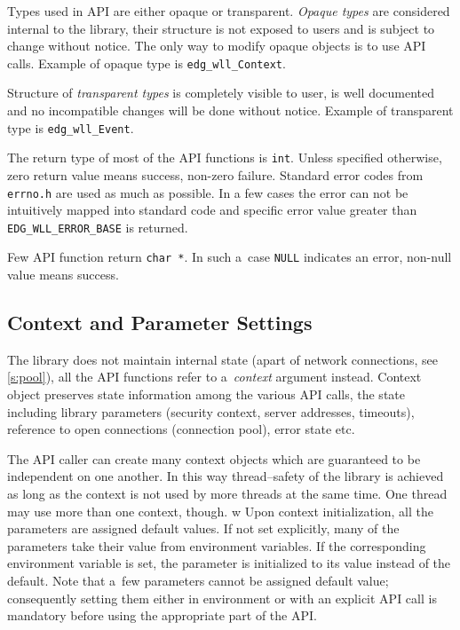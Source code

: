 %
Types used in \LB API are either opaque or transparent. \textit{Opaque
types} are considered internal to the library, their structure is not
exposed to users and is subject to change without notice. The only way
to modify opaque objects is to use API calls. Example of opaque type
is \verb'edg_wll_Context'.

Structure of \textit{transparent types} is completely visible to
user, is well documented and no incompatible changes will be done
without notice. Example of transparent type is
\verb'edg_wll_Event'.

%
The return type of most of the API functions is \verb'int'.
Unless specified otherwise, zero return value means success, non-zero
failure. Standard error codes from \verb'errno.h' are used as
much as possible. In a few cases the error can not be intuitively
mapped into standard code and \LB specific error value greater than
\verb'EDG_WLL_ERROR_BASE' is returned.

Few API function return \verb'char *'. In such a~case
\verb'NULL' indicates an error, non-null value means success.

\subsection{Context and Parameter Settings}
\label{s:context}

The \LB library does not maintain internal state (apart of network
connections, see \ref{s:pool}), all the API
functions refer to a~\emph{context} argument instead.
Context object preserves state information among the various API
calls, the state including \LB library parameters (\eg security
context, server addresses, timeouts), reference to open connections
(connection pool), error state etc.

The API caller can create many context objects which are guaranteed
to be independent on one another. In this way thread--safety of the
library is achieved as long as the context is not used by more threads
at the same time. One thread may use more than one context, though.
w 
Upon context initialization, all the parameters are assigned default
values. If not set explicitly, many of the parameters take their
value from environment variables. If the corresponding environment
variable is set, the parameter is initialized to its value instead of
the default. Note that a~few parameters cannot be assigned default
value; consequently setting them either in environment or with an
explicit API call is mandatory before using the appropriate part of
the API.

